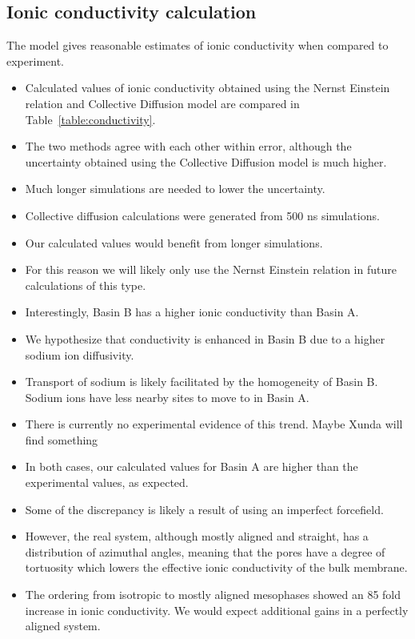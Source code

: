 \documentclass{article}
\begin{document}
  \subsection*{Ionic conductivity calculation}

  The model gives reasonable estimates of ionic conductivity when compared to 
  experiment.
  \begin{itemize}
  	\item Calculated values of ionic conductivity obtained using the Nernst 
	Einstein relation and Collective Diffusion model are compared in 
	Table~\ref{table:conductivity}.
	\item The two methods agree with each other within error, although the 
	uncertainty obtained using the Collective Diffusion model is much higher.
	\item Much longer simulations are needed to lower the uncertainty. %
	\item Collective diffusion calculations were generated from 
	500 ns simulations.
	\item Our calculated values would benefit from longer simulations. 
	\item For this reason we will likely only use the Nernst Einstein relation
	in future calculations of this type. 
	\item Interestingly, Basin B has a higher ionic conductivity than Basin A.
	\item We hypothesize that conductivity is enhanced in Basin B due to a 
	higher sodium ion diffusivity.
	\item Transport of sodium is likely facilitated by the homogeneity of Basin B.
	Sodium ions have less nearby sites to move to in Basin A.
	\item There is currently no experimental evidence of this trend. Maybe Xunda will find something
	\item In both cases, our calculated values for Basin A are higher than the 
	experimental values, as expected. 
	\item Some of the discrepancy is likely a result of using an imperfect forcefield. 
	\item However, the real system, although mostly aligned and straight, has a 
	distribution of azimuthal angles, meaning that the pores have a degree of 
	tortuosity which lowers the effective ionic conductivity of the bulk membrane. 
	\item The ordering from isotropic to mostly aligned mesophases showed an 85 
	fold increase in ionic conductivity. We would expect additional gains in a 
	perfectly aligned system.
  \end{itemize}
	
\end{document}
